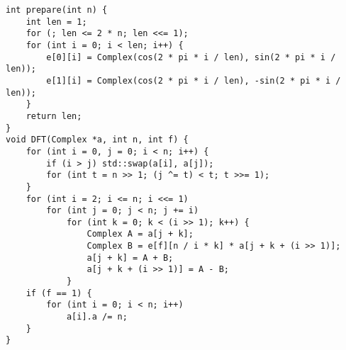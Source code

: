 \begin{lstlisting}
int prepare(int n) {
	int len = 1;
	for (; len <= 2 * n; len <<= 1);
	for (int i = 0; i < len; i++) {
		e[0][i] = Complex(cos(2 * pi * i / len), sin(2 * pi * i / len));
		e[1][i] = Complex(cos(2 * pi * i / len), -sin(2 * pi * i / len));
	}
	return len;
}
void DFT(Complex *a, int n, int f) {
	for (int i = 0, j = 0; i < n; i++) {
		if (i > j) std::swap(a[i], a[j]);
		for (int t = n >> 1; (j ^= t) < t; t >>= 1);
	}
	for (int i = 2; i <= n; i <<= 1)
		for (int j = 0; j < n; j += i)
			for (int k = 0; k < (i >> 1); k++) {
				Complex A = a[j + k];
				Complex B = e[f][n / i * k] * a[j + k + (i >> 1)];
				a[j + k] = A + B;
				a[j + k + (i >> 1)] = A - B;
			}
	if (f == 1) {
		for (int i = 0; i < n; i++)
			a[i].a /= n;
	}
}
\end{lstlisting}
